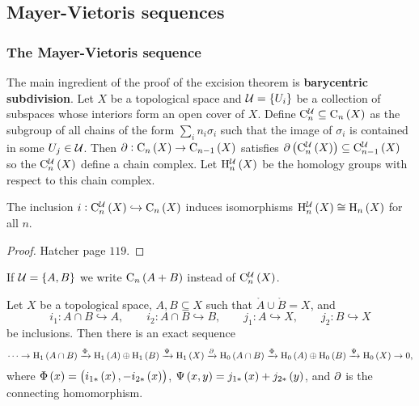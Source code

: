 \subsection{Mayer-Vietoris sequences}

\subsubsection{The Mayer-Vietoris sequence}

The main ingredient of the proof of the excision theorem is \textbf{barycentric subdivision}. Let $ X $ be a topological space and $ \UUU = \cbr{U_i} $ be a collection of subspaces whose interiors form an open cover of $ X $. Define $ \C_n^\UUU \subseteq \C_n\br{X} $ as the subgroup of all chains of the form $ \sum_i n_i\sigma_i $ such that the image of $ \sigma_i $ is contained in some $ U_j \in \mathcal{U} $. Then $ \da : \C_n\br{X} \to \C_{n - 1}\br{X} $ satisfies $ \da\br{\C_n^\UUU\br{X}} \subseteq \C_{n - 1}^\UUU\br{X} $ so the $ \C_n^\UUU\br{X} $ define a chain complex. Let $ \H_n^\UUU\br{X} $ be the homology groups with respect to this chain complex.

\begin{proposition}
The inclusion $ i : \C_n^\UUU\br{X} \hookrightarrow \C_n\br{X} $ induces isomorphisms $ \H_n^\UUU\br{X} \cong \H_n\br{X} $ for all $ n $.
\end{proposition}

\begin{proof}
Hatcher page $ 119 $.
\end{proof}

\begin{notation*}
If $ \UUU = \cbr{A, B} $ we write $ \C_n\br{A + B} $ instead of $ \C_n^\UUU\br{X} $.
\end{notation*}

\pagebreak

\begin{theorem}
Let $ X $ be a topological space, $ A, B \subseteq X $ such that $ \mathring{A} \cup \mathring{B} = X $, and
$$ i_1 : A \cap B \hookrightarrow A, \qquad i_2 : A \cap B \hookrightarrow B, \qquad j_1 : A \hookrightarrow X, \qquad j_2 : B \hookrightarrow X $$
be inclusions. Then there is an exact sequence
$$ \dots \to \H_1\br{A \cap B} \xrightarrow{\Phi} \H_1\br{A} \oplus \H_1\br{B} \xrightarrow{\Psi} \H_1\br{X} \xrightarrow{\da} \H_0\br{A \cap B} \xrightarrow{\Phi} \H_0\br{A} \oplus \H_0\br{B} \xrightarrow{\Psi} \H_0\br{X} \to 0, $$
where $ \Phi\br{x} = \br{i_{1*}\br{x}, -i_{2*}\br{x}} $, $ \Psi\br{x, y} = j_{1*}\br{x} + j_{2*}\br{y} $, and $ \partial $ is the connecting homomorphism.
\end{theorem}

